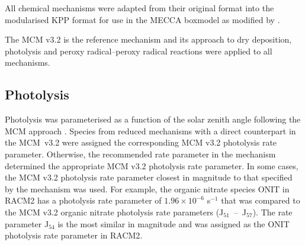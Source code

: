 All chemical mechanisms were adapted from their original format into the modularised KPP \citep{Damian:2002} format for use in the MECCA boxmodel \citep{Sander:2005} as modified by \citep{Butler:2011}.

The MCM v3.2 \citep{Jenkin:1997, Jenkin:2003, Saunders:2003, Bloss:2005, MCM_Site} is the reference mechanism and its approach to dry deposition, photolysis and peroxy radical--peroxy radical reactions were applied to all mechanisms. 

\subsection{Photolysis} \label{ss:photolysis}
Photolysis was parameterised as a function of the solar zenith angle following the MCM approach \citep{Saunders:2003}.
Species from reduced mechanisms with a direct counterpart in the \mbox{MCM v3.2} were assigned the corresponding MCM v3.2 photolysis rate parameter. 
Otherwise, the recommended rate parameter in the mechanism determined the appropriate MCM v3.2 photolysis rate parameter. 
In some cases, the MCM v3.2 photolysis rate parameter closest in magnitude to that specified by the mechanism was used.  
For example, the organic nitrate species ONIT in RACM2 has a photolysis rate parameter of $1.96 \times 10^{-6}$ s$^{-1}$ that was compared to the MCM v3.2 organic nitrate photolysis rate parameters \mbox{(J$_{51}$ -- J$_{57}$)}. 
The rate parameter J$_{54}$ is the most similar in magnitude and was assigned as the ONIT photolysis rate parameter in RACM2.

